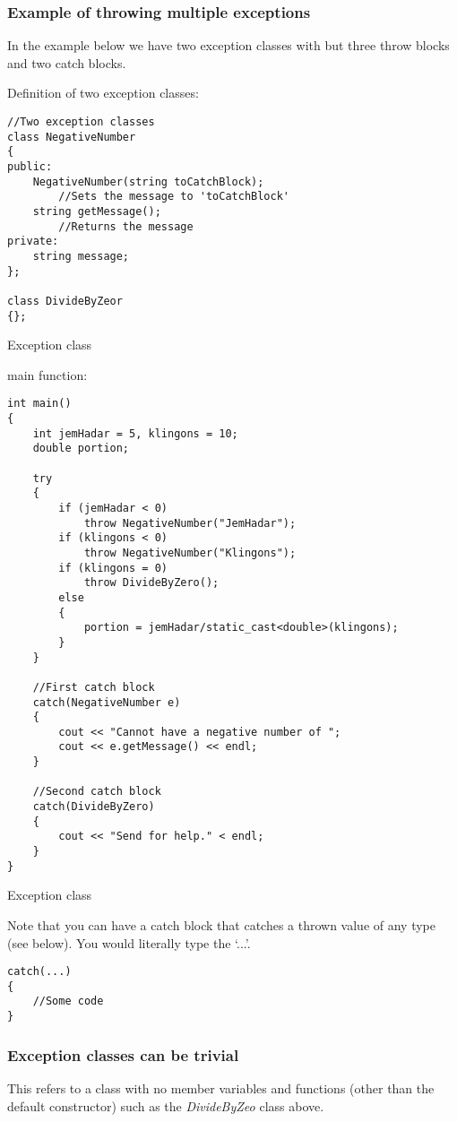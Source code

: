 \subsubsection*{Example of throwing multiple exceptions}
In the example below we have two exception classes with but three throw blocks and two
catch blocks.

\noindent
Definition of two exception classes:
\begin{listing}[H]
\begin{verbatim}
//Two exception classes
class NegativeNumber
{
public:
	NegativeNumber(string toCatchBlock);
		//Sets the message to 'toCatchBlock'
	string getMessage();
		//Returns the message
private:
	string message;
};

class DivideByZeor
{};
\end{verbatim}
\caption{Exception class}
\label{source_code_1}
\end{listing}

\noindent
main function:
\begin{listing}[H]
\begin{verbatim}
int main()
{
	int jemHadar = 5, klingons = 10;
	double portion;
	
	try
	{
		if (jemHadar < 0)
			throw NegativeNumber("JemHadar");
		if (klingons < 0)
			throw NegativeNumber("Klingons");
		if (klingons = 0)
			throw DivideByZero();
		else
		{
			portion = jemHadar/static_cast<double>(klingons);
		}
	}
	
	//First catch block
	catch(NegativeNumber e)
	{
		cout << "Cannot have a negative number of ";
		cout << e.getMessage() << endl;
	}
	
	//Second catch block
	catch(DivideByZero)
	{
		cout << "Send for help." < endl;
	}
}
\end{verbatim}
\caption{Exception class}
\label{source_code_1}
\end{listing}

Note that you can have a catch block that catches a thrown value of any type (see below).
You would literally type the `...'.
\begin{verbatim}
catch(...)
{
	//Some code
}
\end{verbatim}


\subsubsection*{Exception classes can be trivial}
This refers to a class with no member variables and functions (other than the default constructor)
such as the \emph{DivideByZeo} class above. 

